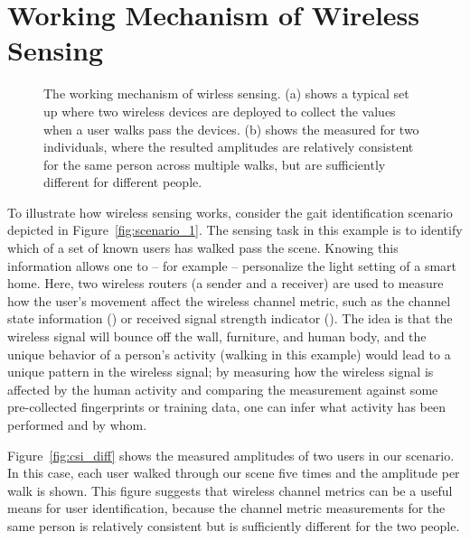 \section{Working Mechanism of Wireless Sensing\label{sec:mechanism}}
\begin{figure} [t!]
       \centering
     \caption{The working mechanism of wirless sensing. (a) shows a typical set up where two wireless devices are deployed
     to collect the \CSI values when a user walks pass the devices. (b)  shows the measured \CSI  for two
     individuals, where the resulted \CSI amplitudes are relatively consistent for the same person across multiple walks, but are sufficiently different for different people.}
     \label{fig:csi_demo}
\end{figure}


To illustrate how wireless sensing works, consider the gait identification scenario depicted in Figure~\ref{fig:scenario_1}. The sensing
task in this example is to identify which of a set of known users has walked pass the scene. Knowing this information allows one to -- for
example -- personalize the light setting of a smart home. Here, two wireless routers (a sender and a receiver) are used to measure how the
user's movement affect the wireless channel metric, such as the channel state information (\CSI) or received signal strength indicator
(\RSSI). The idea is that the wireless signal will bounce off the wall, furniture, and human body, and the unique behavior of a person's
activity (walking in this example) would lead to a unique pattern in the wireless signal; by measuring how the wireless signal is affected
by the human activity and comparing the measurement against some pre-collected fingerprints or training data, one can infer what activity
has been performed and by whom.

Figure~\ref{fig:csi_diff} shows the measured \CSI amplitudes of two users in our scenario. In this case, each user walked through our scene
five times and the \CSI amplitude per walk is shown. This figure suggests that wireless channel metrics can be a useful means for user
identification, because the channel metric measurements for the same person is relatively consistent but is sufficiently different for the
two  people.
